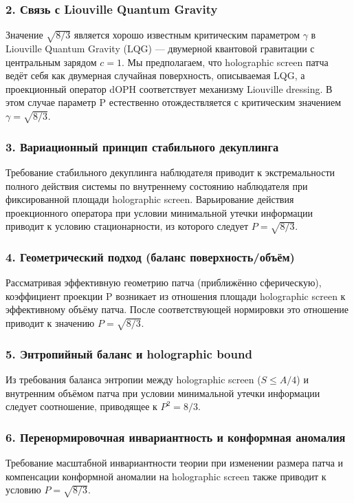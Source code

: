 \documentclass[11pt,a4paper]{article}
\begin{document}
\subsubsection{2. Связь с Liouville Quantum Gravity}
Значение \( \sqrt{8/3} \) является хорошо известным критическим параметром \(\gamma\) 
в Liouville Quantum Gravity (LQG) — двумерной квантовой гравитации с центральным 
зарядом \( c = 1 \). Мы предполагаем, что holographic screen патча ведёт себя как 
двумерная случайная поверхность, описываемая LQG, а проекционный оператор dOPH 
соответствует механизму Liouville dressing. В этом случае параметр P естественно 
отождествляется с критическим значением \(\gamma = \sqrt{8/3}\).

\subsubsection{3. Вариационный принцип стабильного декуплинга}
Требование стабильного декуплинга наблюдателя приводит к экстремальности полного 
действия системы по внутреннему состоянию наблюдателя при фиксированной площади 
holographic screen. Варьирование действия проекционного оператора при условии 
минимальной утечки информации приводит к условию стационарности, из которого следует 
\( P = \sqrt{8/3} \).

\subsubsection{4. Геометрический подход (баланс поверхность/объём)}
Рассматривая эффективную геометрию патча (приближённо сферическую), коэффициент 
проекции P возникает из отношения площади holographic screen к эффективному объёму 
патча. После соответствующей нормировки это отношение приводит к значению 
\( P = \sqrt{8/3} \).

\subsubsection{5. Энтропийный баланс и holographic bound}
Из требования баланса энтропии между holographic screen (\( S \leq A/4 \)) и 
внутренним объёмом патча при условии минимальной утечки информации следует 
соотношение, приводящее к \( P^2 = 8/3 \).

\subsubsection{6. Перенормировочная инвариантность и конформная аномалия}
Требование масштабной инвариантности теории при изменении размера патча и 
компенсации конформной аномалии на holographic screen также приводит к условию 
\( P = \sqrt{8/3} \).
\end{document}
